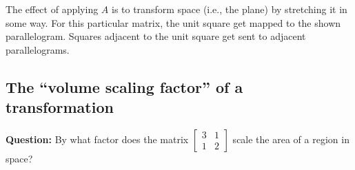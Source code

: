 \documentclass[10pt]{article}
\theoremstyle{definition}
\begin{document}
\begin{center}

   



\end{center}

The effect of applying $A$ is to transform space (i.e., the plane) by
stretching it in some way. For this particular matrix, the unit square get
mapped to the shown parallelogram. Squares adjacent to the unit square get
sent to adjacent parallelograms.

\subsection{The ``volume scaling factor'' of a transformation}
\label{sec:volume-scaling-factor-transformation}
\textbf{Question:} By what factor does the matrix
$\begin{bmatrix}3&1\\1&2\end{bmatrix}$ scale the area of a region in space?
\end{document}
